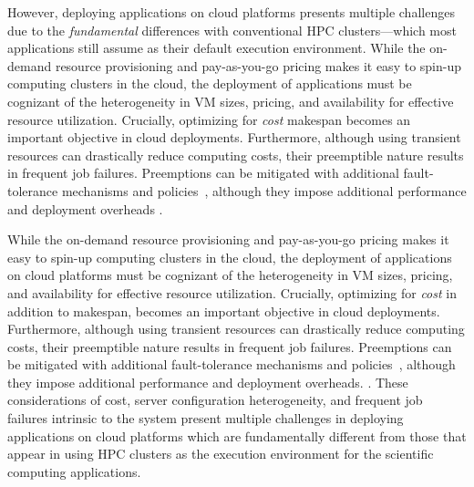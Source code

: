 However, deploying applications on cloud platforms presents multiple challenges due to the  \emph{fundamental} differences with conventional HPC clusters---which most applications still assume as their default execution environment.
%
While the on-demand resource provisioning and pay-as-you-go pricing makes it easy to spin-up computing clusters in the cloud,  the deployment of applications  must be cognizant of the heterogeneity in VM sizes, pricing, and availability for effective resource utilization.
%
Crucially, optimizing for \emph{cost}  makespan\vj{\sout{,}} becomes an important objective in cloud deployments. 
% 
Furthermore, although using transient resources can drastically reduce computing costs, their preemptible nature results in frequent job failures.
%
Preemptions can be mitigated with additional fault-tolerance mechanisms and policies~\cite{flint, marathe2014exploiting}, although they impose additional performance and deployment overheads . 

\vikram
{
While the on-demand resource provisioning and pay-as-you-go pricing makes it easy to spin-up computing clusters in the cloud, the deployment of applications on cloud platforms must be cognizant of the heterogeneity in VM sizes, pricing, and availability for effective resource utilization. Crucially, optimizing for \emph{cost} in addition to makespan, becomes an important objective in cloud deployments. Furthermore, although using transient resources can drastically reduce computing costs, their preemptible nature results in frequent job failures. Preemptions can be mitigated with additional fault-tolerance mechanisms and policies~\cite{flint, marathe2014exploiting}, although they impose additional performance and deployment overheads. . 
These considerations of cost, server configuration heterogeneity, and frequent job failures intrinsic to the system present multiple challenges in deploying applications on cloud platforms which are fundamentally different from those that appear in using HPC clusters as the execution environment for the scientific computing applications.
}

